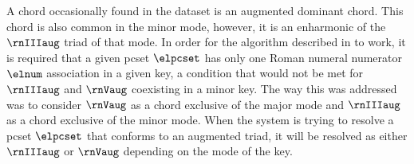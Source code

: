 
A chord occasionally found in the dataset is an augmented
dominant chord. This chord is also common in the minor mode,
however, it is an enharmonic of the $\rnIIIaug$ triad of
that mode. In order for the algorithm described in
to work, it is required that a given \gls{pcset} $\elpcset$
has only one Roman numeral numerator $\elnum$ association in
a given key, a condition that would not be met for
$\rnIIIaug$ and $\rnVaug$ coexisting in a minor key. The way
this was addressed was to consider $\rnVaug$ as a chord
exclusive of the major mode and $\rnIIIaug$ as a chord
exclusive of the minor mode. When the system is trying to
resolve a \gls{pcset} $\elpcset$ that conforms to an
augmented triad, it will be resolved as either $\rnIIIaug$
or $\rnVaug$ depending on the mode of the key.
